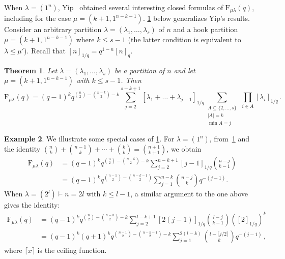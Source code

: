 \documentclass[12pt,a4paper,reqno]{amsart}
\theoremstyle{plain}
\newtheorem{theorem}{Theorem}[section]
\theoremstyle{definition}
\newtheorem{example}[theorem]{Example}
\newcommand{\less}{\unlhd}
\newcommand{\1}{\mathds{1}}
\newcommand{\F}{\mathrm{F}}
\begin{document}
 When $\lambda=(1^n)$, Yip~\cite{Yip}  obtained several interesting closed formulas of $\F_{\mu\lambda}(q)$, including for the case $
\mu=(k+1,1^{n-k-1})$. 
\cref{hook_formula} below generalizes Yip's results.  Consider an arbitrary partition $\lambda=(\lambda_1,\dots,\lambda_s)$ of $n$ and a hook partition $\mu=(k+1,1^{n-k-1})$ where $k\leq s-1$ (the latter condition is equivalent to $\lambda\less \mu'$). Recall that $[n]_{1/q}=q^{1-n}[n]_q$.
\begin{theorem}\label{hook_formula} Let $\lambda=(\lambda_1,\dots,\lambda_s)$ be a partition of $n$ and let $\mu=(k+1,1^{n-k-1})$ with $k\leq s-1$. Then
\begin{equation}
\F_{\mu\lambda}(q)=(q-1)^kq^{\binom{n}{2}-\binom{n-k}{2}-k}\sum_{j=2}^{s-k+1}[\lambda_1+\dots+\lambda_{j-1}]_{1/q}\sum_{\substack{A\subseteq \{2,\dots,s\}\\
|A|=k\\ \min A=j}}\,\prod_{i\in A}[\lambda_i]_{1/q}
\, .
\end{equation}
\end{theorem}

\begin{example} 
We illustrate some special cases of \cref{hook_formula}.
For $\lambda=(1^n)$, from~\cref{hook_formula} and the identity
$\binom{n}{k}+\binom{n-1}{k}+\cdots+\binom{k}{k}=\binom{n+1}{k+1}$, we obtain
\begin{equation}\label{Yip-Formula}
\begin{split}
\F_{\mu\lambda}(q)&=(q-1)^kq^{\binom{n}{2}-\binom{n-k}{2}-k}\sum_{j=2}^{n-k+1}[j-1]_{1/q}\binom{n-j}{k-1}\\
&=(q-1)^kq^{\binom{n-1}{2}-\binom{n-k-1}{2}}\sum_{j=1}^{n-k}\binom{n-j}{k}q^{-(j-1)}.
\end{split}
\end{equation}
When $\lambda=(2^l)\vdash n=2l$ with $k\leq l-1$, a similar argument to the one above gives the identity:
\begin{equation}
\begin{split}
\F_{\mu\lambda}(q)&=(q-1)^kq^{\binom{n}{2}-\binom{n-k}{2}-k}\sum_{j=2}^{l-k+1}[2(j-1)]_{1/q}\binom{l-j}{k-1}([2]_{1/q})^k\\
&=(q-1)^k(q+1)^kq^{\binom{n-1}{2}-\binom{n-k-1}{2}-k}\sum_{j=1}^{2(l-k)}\binom{l-\lceil j/2\rceil}{k}q^{-(j-1)}\, ,
\end{split}
\end{equation}
where $\lceil x \rceil$ is the ceiling function.  
\end{example}
\end{document}
